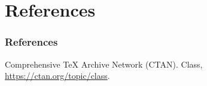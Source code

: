 \documentclass[11pt]{beamer}
\begin{document}
\section{References}

\begin{frame}
	\frametitle{References}
	
	\begin{thebibliography}{Biblio}
		Comprehensive \TeX{} Archive Network (CTAN).
		\newblock Class, \url{https://ctan.org/topic/class}.
	\end{thebibliography}
\end{frame}

\end{document}
